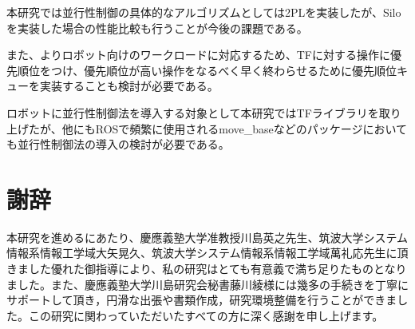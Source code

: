 \documentclass[a4paper]{jreport}	%
\begin{document}
本研究では並行性制御の具体的なアルゴリズムとしては2PLを実装したが、Siloを実装した場合の性能比較も行うことが今後の課題である。

また、よりロボット向けのワークロードに対応するため、TFに対する操作に優先順位をつけ、優先順位が高い操作をなるべく早く終わらせるために優先順位キューを実装することも検討が必要である。

ロボットに並行性制御法を導入する対象として本研究ではTFライブラリを取り上げたが、他にもROSで頻繁に使用されるmove\_baseなどのパッケージにおいても並行性制御法の導入の検討が必要である。

\chapter*{謝辞}

本研究を進めるにあたり、慶應義塾大学准教授川島英之先生、筑波大学システム情報系情報工学域大矢晃久、筑波大学システム情報系情報工学域萬礼応先生に頂きました優れた御指導により、私の研究はとても有意義で満ち足りたものとなりました。また、慶應義塾大学川島研究会秘書藤川綾様には幾多の手続きを丁寧にサポートして頂き，円滑な出張や書類作成，研究環境整備を行うことができました。この研究に関わっていただいたすべての方に深く感謝を申し上げます。

\newpage
{}
\renewcommand{\bibname}{参考文献}


%
%

	
\end{document}
